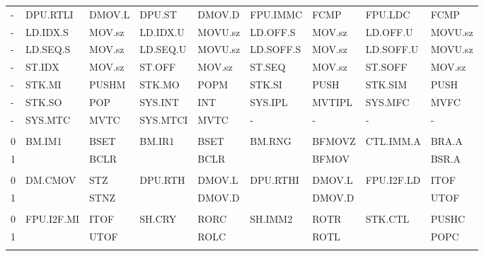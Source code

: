 \begin{table}
\begin{center}
\begin{tabular}{l|ll|ll|ll|ll}
-    & DPU.RTLI   & DMOV.L   & DPU.ST    & DMOV.D          & FPU.IMMC   & FCMP            & FPU.LDC    & FCMP      \\
-    & LD.IDX.S   & MOV.sz   & LD.IDX.U  & MOVU.sz         & LD.OFF.S   & MOV.sz          & LD.OFF.U   & MOVU.sz   \\
-    & LD.SEQ.S   & MOV.sz   & LD.SEQ.U  & MOVU.sz         & LD.SOFF.S  & MOV.sz          & LD.SOFF.U  & MOVU.sz   \\
-    & ST.IDX     & MOV.sz   & ST.OFF    & MOV.sz          & ST.SEQ     & MOV.sz          & ST.SOFF    & MOV.sz    \\
-    & STK.MI     & PUSHM    & STK.MO    & POPM            & STK.SI     & PUSH            & STK.SIM    & PUSH      \\
-    & STK.SO     & POP      & SYS.INT   & INT             & SYS.IPL    & MVTIPL          & SYS.MFC    & MVFC      \\
-    & SYS.MTC    & MVTC     & SYS.MTCI  & MVTC            & -          & -               & -          & -         \\
     &            &          &           &                 &            &                 &            &           \\
0    & BM.IM1     & BSET     & BM.IR1    & BSET            & BM.RNG     & BFMOVZ          & CTL.IMM.A  & BRA.A     \\
1    &            & BCLR     &           & BCLR            &            & BFMOV           &            & BSR.A     \\
     &            &          &           &                 &            &                 &            &           \\
0    & DM.CMOV    & STZ      & DPU.RTH   & DMOV.L          & DPU.RTHI   & DMOV.L          & FPU.I2F.LD & ITOF      \\
1    &            & STNZ     &           & DMOV.D          &            & DMOV.D          &            & UTOF      \\
     &            &          &           &                 &            &                 &            &           \\
0    & FPU.I2F.MI & ITOF     & SH.CRY    & RORC            & SH.IMM2    & ROTR            & STK.CTL    & PUSHC     \\
1    &            & UTOF     &           & ROLC            &            & ROTL            &            & POPC      \\
     &            &          &           &                 &            &                 &            &           \\

\end{tabular}
\end{center}
\end{table}
